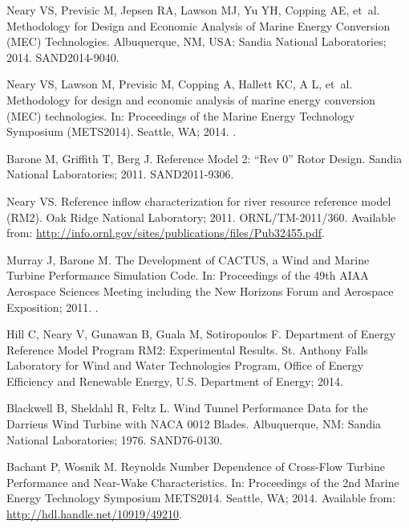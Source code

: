 \documentclass[10pt,letterpaper]{article}
\begin{document}
%

%
\begin{thebibliography}{10}

    Neary VS, Previsic M, Jepsen RA, Lawson MJ, Yu YH, Copping AE, et~al.
    \newblock Methodology for Design and Economic Analysis of Marine Energy
    Conversion ({MEC}) Technologies.
    \newblock Albuquerque, NM, USA: Sandia National Laboratories; 2014.
    SAND2014-9040.

    Neary VS, Lawson M, Previsic M, Copping A, Hallett KC, A L, et~al.
    \newblock Methodology for design and economic analysis of marine energy
    conversion (MEC) technologies.
    \newblock In: Proceedings of the Marine Energy Technology Symposium (METS2014).
    Seattle, WA; 2014. .

    Barone M, Griffith T, Berg J.
    \newblock Reference Model 2: ``Rev 0'' Rotor Design.
    \newblock Sandia National Laboratories; 2011. SAND2011-9306.

    Neary VS.
    \newblock Reference inflow characterization for river resource reference model
    (RM2).
    \newblock Oak Ridge National Laboratory; 2011. ORNL/TM-2011/360.
    \newblock Available from:
    \url{http://info.ornl.gov/sites/publications/files/Pub32455.pdf}.

    Murray J, Barone M.
    \newblock The Development of CACTUS, a Wind and Marine Turbine Performance
    Simulation Code.
    \newblock In: Proceedings of the 49th AIAA Aerospace Sciences Meeting including
    the New Horizons Forum and Aerospace Exposition; 2011. .

    Hill C, Neary V, Gunawan B, Guala M, Sotiropoulos F.
     {D}epartment of {E}nergy {R}eference {M}odel {P}rogram {RM2}:
    Experimental Results.
    \newblock St. Anthony Falls Laboratory for Wind and Water Technologies Program,
    Office of Energy Efficiency and Renewable Energy, U.S. Department of Energy;
    2014.

    Blackwell B, Sheldahl R, Feltz L.
    \newblock Wind Tunnel Performance Data for the {Darrieus} Wind Turbine with
    {NACA} 0012 Blades.
    \newblock Albuquerque, {NM}: Sandia National Laboratories; 1976. SAND76-0130.

    Bachant P, Wosnik M.
    \newblock Reynolds Number Dependence of Cross-Flow Turbine Performance and
    Near-Wake Characteristics.
    \newblock In: Proceedings of the 2nd Marine Energy Technology Symposium
    METS2014. Seattle, WA; 2014. Available from:
    \url{http://hdl.handle.net/10919/49210}.


\end{thebibliography}
\end{document}

